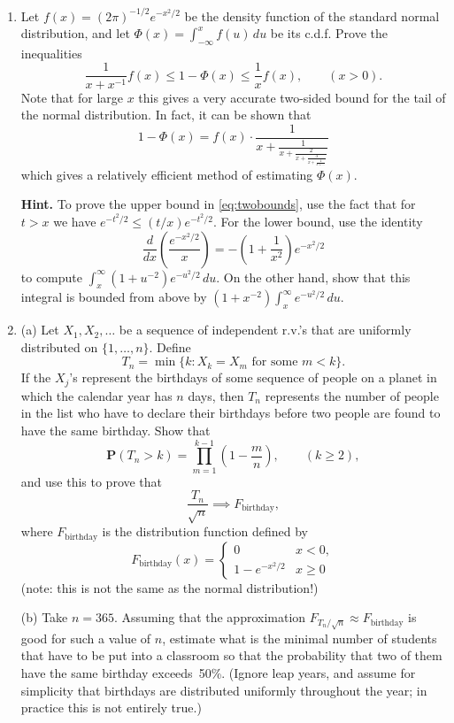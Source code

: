 \documentclass[12pt]{article}
\newcommand{\prob}{\mathbf{P}}
\theoremstyle{example}
\begin{document}
\begin{enumerate}
\item Let $f(x) = (2\pi)^{-1/2} e^{-x^2/2}$ be the density function of the standard normal distribution, and let $\Phi(x) = \int_{-\infty}^x f(u)\,du$ be its c.d.f. Prove the inequalities
\begin{equation}
\label{eq:twobounds}
\frac{1}{x+x^{-1}}f(x) \le 1-\Phi(x) \le \frac{1}{x} f(x), \qquad (x>0).
\end{equation}
Note that for large $x$ this gives a very accurate two-sided bound for the tail of the normal distribution. In fact, it can be shown that
$$ 1-\Phi(x) = f(x) \cdot \frac{1}{x+\frac{1}{x+\frac{2}{x+\frac{3}{x+\frac{4}{x+\ldots}}}}} $$
which gives a relatively efficient method of estimating $\Phi(x)$.

\medskip \noindent
\textbf{Hint.} To prove the upper bound in \eqref{eq:twobounds}, use the fact that for $t>x$ we have $e^{-t^2/2} \le (t/x)e^{-t^2/2}$. For the lower bound, use the identity
$$ \frac{d}{dx}\left(\frac{e^{-x^2/2}}{x}\right) = -\left(1+\frac{1}{x^2}\right) e^{-x^2/2} $$
to compute $\int_x^\infty (1+u^{-2})e^{-u^2/2}\,du$. On the other hand, show that this integral is bounded from above
by $(1+x^{-2})\int_x^{\infty} e^{-u^2/2}\,du$.



\item (a) Let $X_1, X_2, \ldots$ be a sequence of independent r.v.'s that are uniformly distributed on $\{1,\ldots,n\}$. Define
$$T_n = \min\{ k : X_k = X_m\textrm{ for some }m<k\}. $$
If the $X_j$'s represent the birthdays of some sequence of people on a planet in which the calendar year has $n$ days, then $T_n$ represents the number of people in the list who have to declare their birthdays before two people are found to have the same birthday. Show that
$$ \prob(T_n > k) = \prod_{m=1}^{k-1} \left(1-\frac{m}{n}\right), \qquad (k\ge 2),$$
and use this to prove that
$$ \frac{T_n}{\sqrt{n}} \implies F_{\textrm{birthday}}, $$
where $F_{\textrm{birthday}}$ is the distribution function defined by
$$ F_{\textrm{birthday}}(x) = \begin{cases} 0 & x<0, \\ 1- e^{-x^2/2} & x\ge 0 \end{cases} $$
(note: this is not the same as the normal distribution!)

\medskip\noindent (b) Take $n=365$. Assuming that the approximation $F_{T_n/\sqrt{n}} \approx F_{\textrm{birthday}}$ is good for such a value of $n$, estimate what is the minimal number of students that have to be put into a classroom so that the probability that two of them have the same birthday exceeds~50\%. (Ignore leap years, and assume for simplicity that birthdays are distributed uniformly throughout the year; in practice this is not entirely true.)




\end{enumerate}
\end{document}
